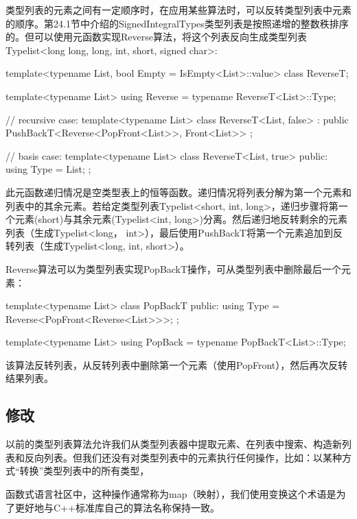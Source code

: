 类型列表的元素之间有一定顺序时，在应用某些算法时，可以反转类型列表中元素的顺序。第24.1节中介绍的SignedIntegralTypes类型列表是按照递增的整数秩排序的。但可以使用元函数实现Reverse算法，将这个列表反向生成类型列表Typelist<long long, long, int, short, signed char>:

\begin{cpp}
template<typename List, bool Empty = IsEmpty<List>::value>
class ReverseT;

template<typename List>
using Reverse = typename ReverseT<List>::Type;

// recursive case:
template<typename List>
class ReverseT<List, false>
: public PushBackT<Reverse<PopFront<List>>, Front<List>> { };

// basis case:
template<typename List>
class ReverseT<List, true> {
	public:
	using Type = List;
};
\end{cpp}

此元函数递归情况是空类型表上的恒等函数。递归情况将列表分解为第一个元素和列表中的其余元素。若给定类型列表Typelist<short, int, long>，递归步骤将第一个元素(short)与其余元素(Typelist<int, long>)分离。然后递归地反转剩余的元素列表（生成Typelist<long， int>），最后使用PushBackT将第一个元素追加到反转列表（生成Typelist<long, int, short>）。

Reverse算法可以为类型列表实现PopBackT操作，可从类型列表中删除最后一个元素：

\begin{cpp}
template<typename List>
class PopBackT {
	public:
	using Type = Reverse<PopFront<Reverse<List>>>;
};

template<typename List>
using PopBack = typename PopBackT<List>::Type;
\end{cpp}

该算法反转列表，从反转列表中删除第一个元素（使用PopFront），然后再次反转结果列表。

\subsection{修改}

以前的类型列表算法允许我们从类型列表器中提取元素、在列表中搜索、构造新列表和反向列表。但我们还没有对类型列表中的元素执行任何操作，比如：以某种方式“转换”类型列表中的所有类型，

\begin{notice}
函数式语言社区中，这种操作通常称为map（映射），我们使用变换这个术语是为了更好地与C++标准库自己的算法名称保持一致。
\end{notice}

